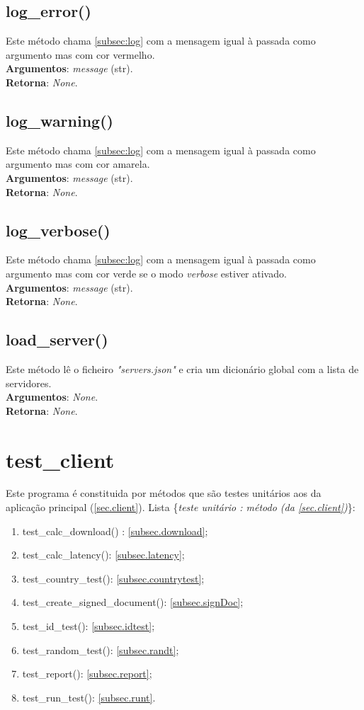 \documentclass{report}
\begin{document}
\subsection{log\_error()}
Este método chama \autoref{subsec:log} com a mensagem igual à passada como argumento mas com cor vermelho.\\ 
\textbf{Argumentos}:
\textit{message} (str).\\
\textbf{Retorna}: \textit{None}.

\subsection{log\_warning()}
Este método chama \autoref{subsec:log} com a mensagem igual à passada como argumento mas com cor amarela.\\ 
\textbf{Argumentos}:
\textit{message} (str).\\
\textbf{Retorna}: \textit{None}.

\subsection{log\_verbose()}
Este método chama \autoref{subsec:log} com a mensagem igual à passada como argumento mas com cor verde se o modo \textit{verbose} estiver ativado.\\ 
\textbf{Argumentos}:
\textit{message} (str).\\
\textbf{Retorna}: \textit{None}.

\subsection{load\_server()}
\label{subsec:loadserver}
Este método lê o ficheiro \textit{"servers.json"} e cria um dicionário global com a lista de servidores.\\
\textbf{Argumentos}:
\textit{None}.\\
\textbf{Retorna}: \textit{None}.

\section{test\_client}
Este programa é constituida por métodos que são testes unitários aos da aplicação principal (\autoref{sec.client}). Lista \{\textit{teste unitário : método (da \autoref{sec.client})}\}:
\begin{enumerate}
\item test\_calc\_download() : \autoref{subsec.download};
\item test\_calc\_latency(): \autoref{subsec.latency};
\item test\_country\_test(): \autoref{subsec.countrytest};
\item test\_create\_signed\_document(): \autoref{subsec.signDoc};
\item test\_id\_test(): \autoref{subsec.idtest};
\item test\_random\_test(): \autoref{subsec.randt};
\item test\_report(): \autoref{subsec.report};
\item test\_run\_test(): \autoref{subsec.runt}.
\end{enumerate}
\end{document}

